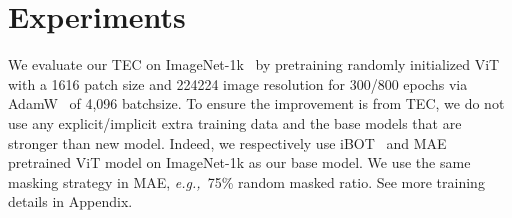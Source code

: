 \documentclass{article} \usepackage{iclr2023_conference,times}
\def\eg{\emph{e.g.,~}}
\begin{document}
\vspace{-5pt}
\section{Experiments}
\vspace{-10pt}
We evaluate our TEC  on ImageNet-1k~\citep{deng2009imagenet} by pretraining   randomly initialized  ViT~\citep{dosovitskiy2020image} with a 1616 patch size and 224224 image resolution for 300/800 epochs via AdamW~\citep{loshchilov2017decoupled}  of 4,096 batchsize. To ensure the improvement is from TEC, we do not use any explicit/implicit extra training data and  the base models that are stronger than new model. 
Indeed, we respectively use   iBOT~\citep{zhou2021ibot} and MAE~\citep{he2022masked} pretrained ViT model  on ImageNet-1k  as our base model. 
We use the same masking strategy in MAE, \eg  75\% random masked ratio. See more training details in Appendix.
\end{document}
